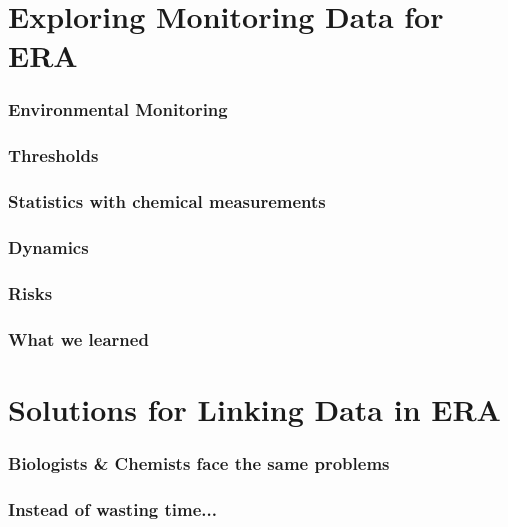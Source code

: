 \documentclass[10pt
]{beamer}
\begin{document}
\section{Exploring Monitoring Data for ERA}

\begin{frame}
\frametitle{Environmental Monitoring}

\end{frame}

\begin{frame}
\frametitle{Thresholds}

\end{frame}

\begin{frame}
\frametitle{Statistics with chemical measurements}

\end{frame}


\begin{frame}
\frametitle{Dynamics}

\end{frame}


\begin{frame}
\frametitle{Risks}

\end{frame}


\begin{frame}
\frametitle{What we learned}

\end{frame}

\section{Solutions for Linking Data in ERA}

\begin{frame}
\frametitle{Biologists \& Chemists face the same problems}

\end{frame}


\begin{frame}
\frametitle{Instead of wasting time...}

\end{frame}
\end{document}
